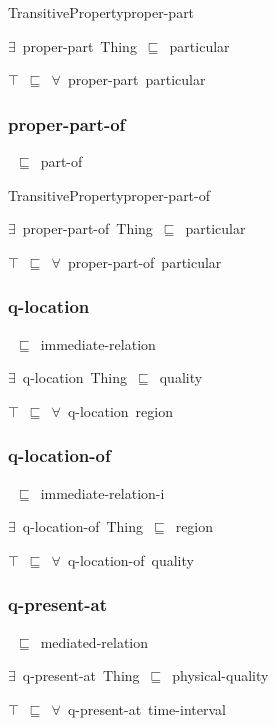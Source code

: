 \documentclass{article}
\begin{document}
TransitivePropertyproper-part

\ensuremath{\exists}~proper-part~Thing~\ensuremath{\sqsubseteq}~particular

\ensuremath{\top}~\ensuremath{\sqsubseteq}~\ensuremath{\forall}~proper-part~particular

\subsubsection*{proper-part-of}

~\ensuremath{\sqsubseteq}~part-of

TransitivePropertyproper-part-of

\ensuremath{\exists}~proper-part-of~Thing~\ensuremath{\sqsubseteq}~particular

\ensuremath{\top}~\ensuremath{\sqsubseteq}~\ensuremath{\forall}~proper-part-of~particular

\subsubsection*{q-location}

~\ensuremath{\sqsubseteq}~immediate-relation

\ensuremath{\exists}~q-location~Thing~\ensuremath{\sqsubseteq}~quality

\ensuremath{\top}~\ensuremath{\sqsubseteq}~\ensuremath{\forall}~q-location~region

\subsubsection*{q-location-of}

~\ensuremath{\sqsubseteq}~immediate-relation-i

\ensuremath{\exists}~q-location-of~Thing~\ensuremath{\sqsubseteq}~region

\ensuremath{\top}~\ensuremath{\sqsubseteq}~\ensuremath{\forall}~q-location-of~quality

\subsubsection*{q-present-at}

~\ensuremath{\sqsubseteq}~mediated-relation

\ensuremath{\exists}~q-present-at~Thing~\ensuremath{\sqsubseteq}~physical-quality

\ensuremath{\top}~\ensuremath{\sqsubseteq}~\ensuremath{\forall}~q-present-at~time-interval
\end{document}
